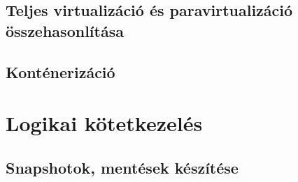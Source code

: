 \subsection{Teljes virtualizáció és paravirtualizáció összehasonlítása}
\subsection{Konténerizáció}

\section{Logikai kötetkezelés}
\subsection{Snapshotok, mentések készítése}
